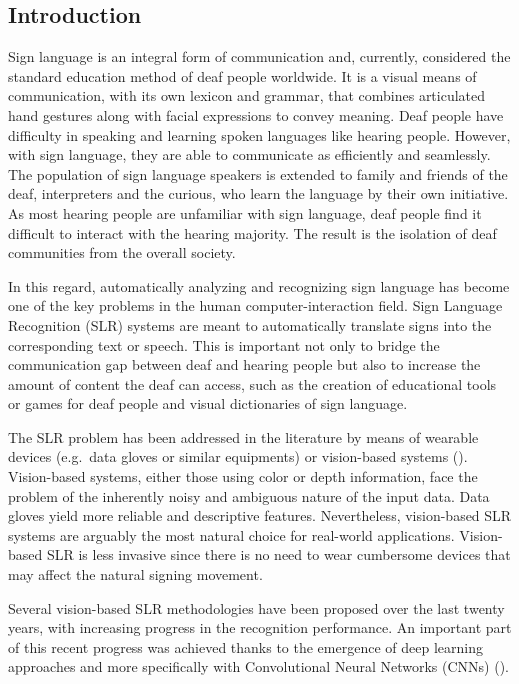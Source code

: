 \subsection{Introduction}
Sign language is an integral form of communication and, currently, considered the standard education method of deaf people worldwide. It is a visual means of communication, with its own lexicon and grammar, that combines articulated hand gestures along with facial expressions to convey meaning. Deaf people have difficulty in speaking and learning spoken languages like hearing people. However, with sign language, they are able to communicate as efficiently and seamlessly. The population of sign language speakers is extended to family and friends of the deaf, interpreters and the curious, who learn the language by their own initiative. As most hearing people are unfamiliar with sign language, deaf people find it difficult to interact with the hearing majority. The result is the isolation of deaf communities from the overall society.

In this regard, automatically analyzing and recognizing sign language has become one of the key problems in the human computer-interaction field. Sign Language Recognition (SLR) systems are meant to automatically translate signs into the corresponding text or speech. This is important not only to bridge the communication gap between deaf and hearing people but also to increase the amount of content the deaf can access, such as the creation of educational tools or games for deaf people and visual dictionaries of sign language.

The SLR problem has been addressed in the literature by means of wearable devices (e.g.\ data gloves or similar equipments) or vision-based systems (\citet{Ahdal2012}). Vision-based systems, either those using color or depth information, face the problem of the inherently noisy and ambiguous nature of the input data. Data gloves yield more reliable and descriptive features. Nevertheless, vision-based SLR systems are arguably the most natural choice for real-world applications. Vision-based SLR is less invasive since there is no need to wear cumbersome devices that may affect the natural signing movement.

Several vision-based SLR methodologies have been proposed over the last twenty years, with increasing progress in the recognition performance. An important part of this recent progress was achieved thanks to the emergence of deep learning approaches and more specifically with Convolutional Neural Networks (CNNs) (\citet{Pigou2015, Koller2016, Wu2016, Neverova2016, Kumar2017}).

